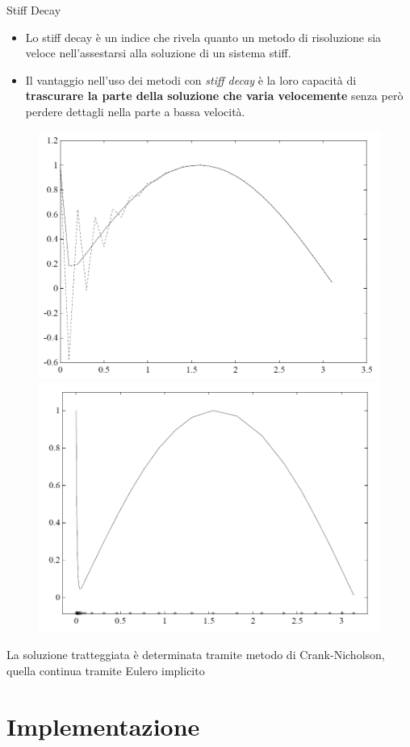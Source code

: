 \documentclass[aspectratio=169, 10pt, handout,usenames,dvipsnames]{beamer}
\begin{document}
    \begin{frame}{Stiff Decay}
        \medskip
        \medskip
        \begin{itemize}
        \item Lo stiff decay è un \alert{indice} che rivela quanto un metodo di risoluzione sia veloce nell’assestarsi alla soluzione di un sistema stiff.\\
        \item Il vantaggio nell'uso dei metodi con \textit{stiff decay} è la loro capacità di \textbf{trascurare la parte della soluzione che
        varia velocemente} senza però perdere dettagli nella parte a bassa velocità.
        \end{itemize}
        \begin{figure}
        \includegraphics[width=.4\linewidth]{fig8.png}
        \includegraphics[width=.4\linewidth]{fig9.png}
        \label{fig:my_label}
    \end{figure}
        \begin{centering}
        La soluzione tratteggiata è determinata tramite metodo di Crank-Nicholson, quella continua tramite Eulero implicito
        \end{centering}
    \end{frame}

\section{Implementazione}\label{sec:sec12}  
\end{document}
